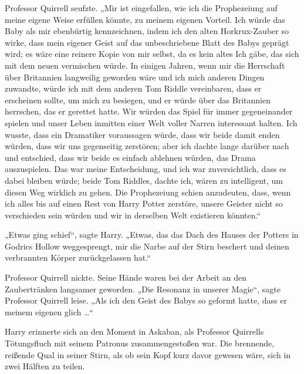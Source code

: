 Professor Quirrell seufzte.
„Mir ist eingefallen, wie ich die Prophezeiung auf meine eigene Weise erfüllen könnte, zu meinem eigenen Vorteil. Ich würde das Baby als mir ebenbürtig kennzeichnen, indem ich den alten Horkrux-Zauber so wirke, dass mein eigener Geist auf das unbeschriebene Blatt des Babys geprägt wird; es wäre eine reinere Kopie von mir selbst, da es kein altes Ich gäbe, das sich mit dem neuen vermischen würde. In einigen Jahren, wenn mir die Herrschaft über Britannien langweilig geworden wäre und ich mich anderen Dingen zuwandte, würde ich mit dem anderen Tom Riddle vereinbaren, dass er erscheinen sollte, um mich zu besiegen, und er würde über das Britannien herrschen, das er gerettet hatte. Wir würden das Spiel für immer gegeneinander spielen und unser Leben inmitten einer Welt voller Narren interessant halten. Ich wusste, dass ein Dramatiker voraussagen würde, dass wir beide damit enden würden, dass wir uns gegenseitig zerstören; aber ich dachte lange darüber nach und entschied, dass wir beide es einfach ablehnen würden, das Drama auszuspielen. Das war meine Entscheidung, und ich war zuversichtlich, dass es dabei bleiben würde; beide Tom Riddles, dachte ich, wären zu intelligent, um diesen Weg wirklich zu gehen. Die Prophezeiung schien anzudeuten, dass, wenn ich alles bis auf einen Rest von Harry Potter zerstöre, unsere Geister nicht so verschieden sein würden und wir in derselben Welt existieren könnten.“

„Etwas ging schief“, sagte Harry.
„Etwas, das das Dach des Hauses der Potters in Godrics Hollow weggesprengt, mir die Narbe auf der Stirn beschert und deinen verbrannten Körper zurückgelassen hat.“

Professor Quirrell nickte. Seine Hände waren bei der Arbeit an den Zaubertränken langsamer geworden.
„Die Resonanz in unserer Magie“, sagte Professor Quirrell leise.
„Als ich den Geist des Babys so geformt hatte, dass er meinem eigenen glich …“

Harry erinnerte sich an den Moment in Askaban, als Professor Quirrells Tötungsfluch mit seinem Patronus zusammengestoßen war. Die brennende, reißende Qual in seiner Stirn, als ob sein Kopf kurz davor gewesen wäre, sich in zwei Hälften zu teilen.


